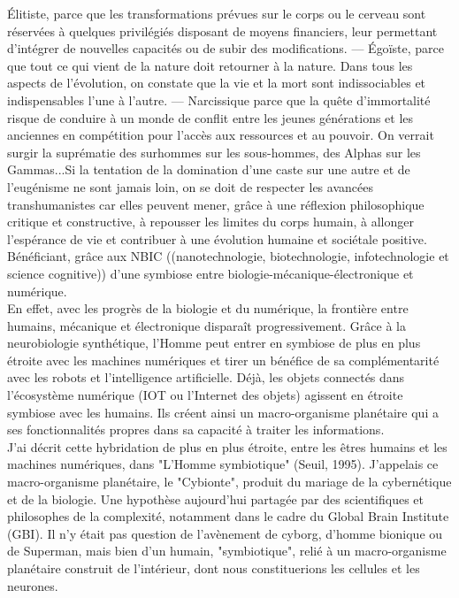 \documentclass[11pt,twoside,a4paper]{article}
\begin{document}
{\'E}litiste, parce que les transformations pr{\'e}vues sur le corps ou le cerveau sont r{\'e}serv{\'e}es {\`a} quelques privil{\'e}gi{\'e}s disposant de moyens financiers, leur permettant d'int{\'e}grer de nouvelles capacit{\'e}s ou de subir des modifications. --- {\'E}go{\"i}ste, parce que tout ce qui vient de la nature doit retourner {\`a} la nature. Dans tous les aspects de l'{\'e}volution, on constate que la vie et la mort sont indissociables et indispensables l'une {\`a} l'autre. --- Narcissique parce que la qu{\^e}te d'immortalit{\'e} risque de conduire {\`a} un monde de conflit entre les jeunes g{\'e}n{\'e}rations et les anciennes en comp{\'e}tition pour l'acc{\`e}s aux ressources et au pouvoir. On verrait surgir la supr{\'e}matie des surhommes sur les sous-hommes, des Alphas sur les Gammas...Si la tentation de la domination d'une caste sur une autre et de l'eug{\'e}nisme ne sont jamais loin, on se doit de respecter les avanc{\'e}es transhumanistes car elles peuvent mener, gr{\^a}ce {\`a} une r{\'e}flexion philosophique critique et constructive, {\`a} repousser les limites du corps humain, {\`a} allonger l'esp{\'e}rance de vie et contribuer {\`a} une {\'e}volution humaine et soci{\'e}tale positive. B{\'e}n{\'e}ficiant, gr{\^a}ce aux NBIC ((nanotechnologie, biotechnologie, infotechnologie et science cognitive)) d'une symbiose entre biologie-m{\'e}canique-{\'e}lectronique et num{\'e}rique. ~\\

En effet, avec les progr{\`e}s de la biologie et du num{\'e}rique, la fronti{\`e}re entre humains, m{\'e}canique et {\'e}lectronique dispara{\^i}t progressivement. Gr{\^a}ce {\`a} la neurobiologie synth{\'e}tique, l'Homme peut entrer en symbiose de plus en plus {\'e}troite avec les machines num{\'e}riques et tirer un b{\'e}n{\'e}fice de sa compl{\'e}mentarit{\'e} avec les robots et l'intelligence artificielle. D{\'e}j{\`a}, les objets connect{\'e}s dans l'{\'e}cosyst{\`e}me num{\'e}rique (IOT ou l'Internet des objets) agissent en {\'e}troite symbiose avec les humains. Ils cr{\'e}ent ainsi un macro-organisme plan{\'e}taire qui a ses fonctionnalit{\'e}s propres dans sa capacit{\'e} {\`a} traiter les informations. ~\\

J'ai d{\'e}crit cette hybridation de plus en plus {\'e}troite, entre les {\^e}tres humains et les machines num{\'e}riques, dans "L'Homme symbiotique" (Seuil, 1995). J'appelais ce macro-organisme plan{\'e}taire, le "Cybionte", produit du mariage de la cybern{\'e}tique et de la biologie. Une hypoth{\`e}se aujourd'hui partag{\'e}e par des scientifiques et philosophes de la complexit{\'e}, notamment dans le cadre du Global Brain Institute (GBI). Il n'y {\'e}tait pas question de l'av{\`e}nement de cyborg, d'homme bionique ou de Superman, mais bien d'un humain, "symbiotique", reli{\'e} {\`a} un macro-organisme plan{\'e}taire construit de l'int{\'e}rieur, dont nous constituerions les cellules et les neurones. ~\\
\end{document}
